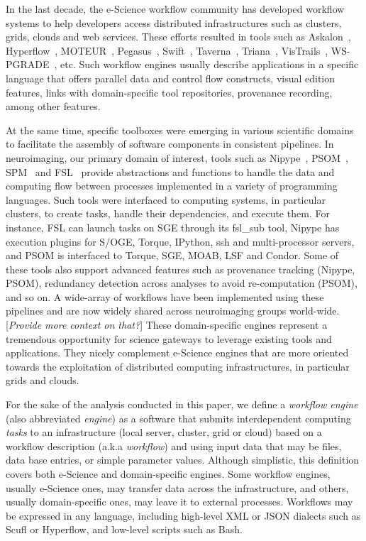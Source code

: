 \documentclass[preprint,3p,twocolumn]{elsarticle}
\newcommand{\todo}[1]{\color{blue}\xspace[\emph{#1}]\xspace\color{black}}
\begin{document}
In the last decade, the e-Science workflow community has developed
workflow systems to help developers access distributed infrastructures
such as clusters, grids, clouds and web services. These efforts
resulted in tools such as Askalon~\cite{fahringer2005askalon},
Hyperflow~\cite{balis2016hyperflow}, MOTEUR~\cite{GLAT-08i},
Pegasus~\cite{deelman2005pegasus,Deelman201517},
Swift~\cite{zhao2007swift}, Taverna~\cite{oinn2004taverna},
Triana~\cite{taylor2007triana}, VisTrails~\cite{callahan2006managing},
WS-PGRADE~\cite{Kacsuk2012}, etc. Such
workflow engines usually describe applications in a specific language
that offers parallel data and control flow constructs, visual edition
features, links with domain-specific tool repositories, provenance
recording, among other features.

At the same time, specific toolboxes were emerging in various
scientific domains to facilitate the assembly of software components
in consistent pipelines. In neuroimaging, our primary domain of
interest, tools such as Nipype~\cite{gorgolewski2011nipype},
PSOM~\cite{bellec2012pipeline}, SPM~\cite{ashburner2011spm} and
FSL~\cite{Jenkinson2012782} provide abstractions and functions to
handle the data and computing flow between processes implemented in a
variety of programming languages. Such tools were interfaced to
computing systems, in particular clusters, to create tasks, handle
their dependencies, and execute them. For instance, FSL can launch
tasks on SGE through its fsl\_sub tool, Nipype has execution
plugins for S/OGE, Torque, IPython, ssh and multi-processor servers,
and PSOM is interfaced to Torque, SGE, MOAB, LSF and Condor. Some of
these tools also support advanced features such as provenance tracking
(Nipype, PSOM), redundancy detection across analyses to avoid
re-computation (PSOM), and so on. A wide-array of workflows have been
implemented using these pipelines and are now widely shared across
neuroimaging groups world-wide. \todo{Provide more context on that?}
These domain-specific engines represent a tremendous opportunity for
science gateways to leverage existing tools and applications. They
nicely complement e-Science engines that are more oriented towards the
exploitation of distributed computing infrastructures, in particular
grids and clouds.

For the sake of the analysis conducted in this paper, we
define a \emph{workflow engine} (also abbreviated \emph{engine}) as a
software that submits interdependent computing \emph{tasks} to an
infrastructure (local server, cluster, grid or cloud) based on a
workflow description (a.k.a \emph{workflow}) and using input data that
may be files, data base entries, or simple parameter values. Although
simplistic, this definition covers both e-Science and domain-specific
engines. Some workflow engines, usually e-Science ones, may transfer
data across the infrastructure, and others, usually domain-specific
ones, may leave it to external processes. Workflows may be expressed
in any language, including high-level XML or JSON dialects such as
Scufl or Hyperflow, and low-level scripts such as
Bash. 
\end{document}
